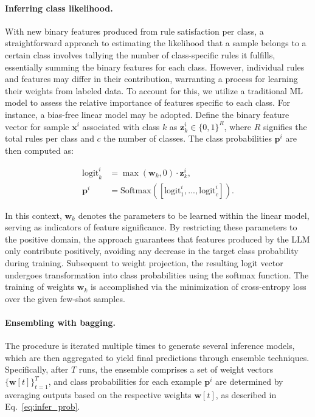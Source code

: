 \vspace*{-0.12in}
\paragraph{Inferring class likelihood.} With new binary features produced from rule satisfaction per class, a straightforward approach to estimating the likelihood that a sample belongs to a certain class involves tallying the number of class-specific rules it fulfills, essentially summing the binary features for each class. However, individual rules and features may differ in their contribution, warranting a process for learning their weights from labeled data. To account for this, we utilize a traditional ML model to assess the relative importance of features specific to each class. For instance, a bias-free linear model may be adopted. Define the binary feature vector for sample $\mathbf{x}^i$ associated with class $k$ as $\mathbf{z}_k^i \in \{0, 1\}^R$, where $R$ signifies the total rules per class and $c$ the number of classes. The class probabilities $\mathbf{p}^i$ are then computed as:

\begin{align}
\text{logit}_k^i &= \max(\mathbf{w}_k, 0) \cdot \mathbf{z}_k^i, \nonumber \\
\mathbf{p}^i &= \text{Softmax}({[\text{logit}_{1}^i, ..., \text{logit}_{c}^i]}). \label{eq:infer_prob}
\end{align}

In this context, $\mathbf{w}_k$ denotes the parameters to be learned within the linear model, serving as indicators of feature significance. By restricting these parameters to the positive domain, the approach guarantees that features produced by the LLM only contribute positively, avoiding any decrease in the target class probability during training. Subsequent to weight projection, the resulting logit vector undergoes transformation into class probabilities using the softmax function. The training of weights $\mathbf{w}_k$ is accomplished via the minimization of cross-entropy loss over the given few-shot samples.

\vspace*{-0.12in}
\paragraph{Ensembling with bagging.} The procedure is iterated multiple times to generate several inference models, which are then aggregated to yield final predictions through ensemble techniques. Specifically, after $T$ runs, the ensemble comprises a set of weight vectors $\{\mathbf{w}[t]\}_{t=1}^T$, and class probabilities for each example $\mathbf{p}^i$ are determined by averaging outputs based on the respective weights $\mathbf{w}[t]$, as described in Eq.~\ref{eq:infer_prob}.

